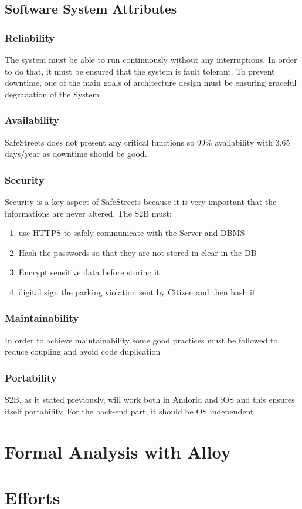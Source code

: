 \documentclass{article}
\begin{document}
\subsection{Software System Attributes}
\subsubsection{Reliability}
The system must be able to run continuously without any interruptions. In order to do that, it must be ensured 
that the system is fault tolerant. To prevent downtime, one of the main goals of architecture design must be 
ensuring graceful degradation of the System
\subsubsection{Availability}
SafeStreets does not present any critical functions so 99\% availability with 3.65 days/year
as downtime should be good.  
\subsubsection{Security}
Security is a key aspect of SafeStreets because it is very important that the informations are never altered.
The S2B must:
\begin{enumerate}
 \item use HTTPS to safely communicate with the Server and DBMS    
 \item Hash the passwords so that they are not stored in clear in the DB
 \item Encrypt sensitive data before storing it
 \item digital sign the parking violation sent by Citizen and then hash it  
\end{enumerate} 
\subsubsection{Maintainability}
In order to achieve maintainability some good practices must be followed to reduce coupling and avoid code duplication 
\subsubsection{Portability}
S2B, as it stated previously, will work both in Andorid and iOS and this ensures itself portability. For 
the back-end part, it should be OS independent





\section{Formal Analysis with Alloy}

\section{Efforts}
\end{document}
